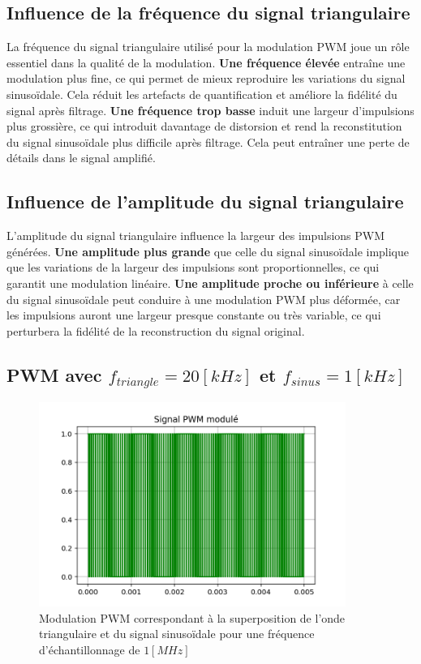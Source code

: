\documentclass[a4paper,12pt,oneside]{report}	%
\begin{document}
        \subsection{Influence de la fréquence du signal triangulaire}
            La fréquence du signal triangulaire utilisé pour la modulation PWM joue un rôle essentiel dans la qualité de la modulation. \textbf{Une fréquence élevée} entraîne une modulation plus fine, ce qui permet de mieux reproduire les variations du signal sinusoïdale. Cela réduit les artefacts de quantification et améliore la fidélité du signal après filtrage. \textbf{Une fréquence trop basse} induit une largeur d'impulsions plus grossière, ce qui introduit davantage de distorsion et rend la reconstitution du signal sinusoïdale plus difficile après filtrage. Cela peut entraîner une perte de détails dans le signal amplifié.
        \subsection{Influence de l'amplitude du signal triangulaire}
            L'amplitude du signal triangulaire influence la largeur des impulsions PWM générées. \textbf{Une amplitude plus grande} que celle du signal sinusoïdale implique que les variations de la largeur des impulsions sont proportionnelles, ce qui garantit une modulation linéaire. \textbf{Une amplitude proche ou inférieure} à celle du signal sinusoïdale peut conduire à une modulation PWM plus déformée, car les impulsions auront une largeur presque constante ou très variable, ce qui perturbera la fidélité de la reconstruction du signal original.
        \subsection{PWM avec $f_{triangle}=20 [kHz]$ et $f_{sinus}=1 [kHz]$}
        \begin{figure}[h!]
                \centering
                \includegraphics[width=10cm]{images/1.1.4 - PWM btw sin and tri.png}
                \caption{Modulation PWM correspondant à la superposition de l'onde triangulaire et du signal sinusoïdale pour une fréquence d’échantillonnage de $1 [MHz]$}
                \label{fig:echantillon_1MHz}
            \end{figure}
\newpage
\end{document}

